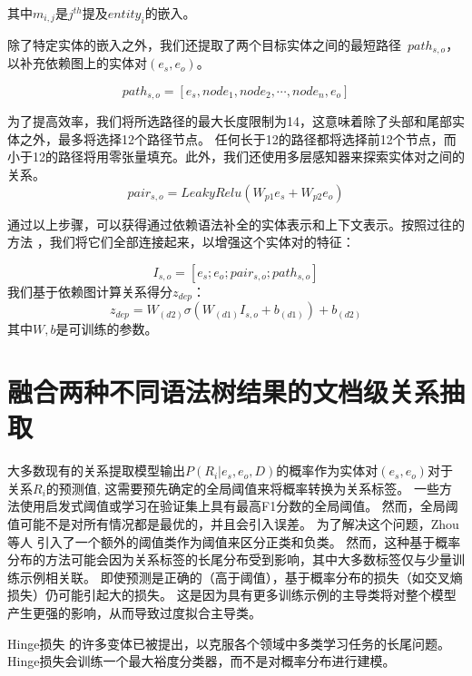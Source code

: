 \documentclass[bachelor]{thesis-uestc}
\begin{document}
其中$m_{i, j}$是$j^{th}$提及$entity_i$的嵌入。\par
除了特定实体的嵌入之外，我们还提取了两个目标实体之间的最短路径\ $path_{s, o}$，以补充依赖图上的实体对$(e_s,e_o)$。

\begin{equation}
    path_{s,o} = [ e_s, node_1, node_2, \cdots, node_n, e_o ]
\end{equation}

为了提高效率，我们将所选路径的最大长度限制为14，这意味着除了头部和尾部实体之外，最多将选择12个路径节点。
任何长于12的路径都将选择前12个节点，而小于12的路径将用零张量填充。此外，我们还使用多层感知器来探索实体对之间的关系。
\begin{equation}
    pair_{s,o} = LeakyRelu(W_{p1}e_s + W_{p2}e_o)
\end{equation}
\par

通过以上步骤，可以获得通过依赖语法补全的实体表示和上下文表示。按照过往的方法 \cite{mou-etal-2016-natural}，我们将它们全部连接起来，以增强这个实体对的特征：

\begin{equation}
    I_{s,o} = [e_s;e_o;pair_{s,o};path_{s,o}]
\end{equation}
我们基于依赖图计算关系得分$z_{dep}$：
\begin{equation}
    z_{dep} = W_{(d2)} \sigma (W_{(d1)}I_{s,o} + b_{(d1)}) + b_{(d2)}
\end{equation}
其中$W, b$是可训练的参数。\par

\section{融合两种不同语法树结果的文档级关系抽取}
大多数现有的关系提取模型输出$P(R_i|e_s, e_o, D)$的概率作为实体对$(e_s, e_o)$对于关系$R_i$的预测值, 这需要预先确定的全局阈值来将概率转换为关系标签。
一些方法使用启发式阈值或学习在验证集上具有最高F1分数的全局阈值。
然而，全局阈值可能不是对所有情况都是最优的，并且会引入误差。
为了解决这个问题，Zhou等人 \cite{Zhao2022DocumentlevelRE}引入了一个额外的阈值类作为阈值来区分正类和负类。
然而，这种基于概率分布的方法可能会因为关系标签的长尾分布受到影响，其中大多数标签仅与少量训练示例相关联。
即使预测是正确的（高于阈值），基于概率分布的损失（如交叉熵损失）仍可能引起大的损失。
这是因为具有更多训练示例的主导类将对整个模型产生更强的影响，从而导致过度拟合主导类。\par
Hinge损失 \cite{Gentile1998LinearHL} 的许多变体已被提出，以克服各个领域中多类学习任务的长尾问题。
Hinge损失会训练一个最大裕度分类器，而不是对概率分布进行建模。
\par
\end{document}
